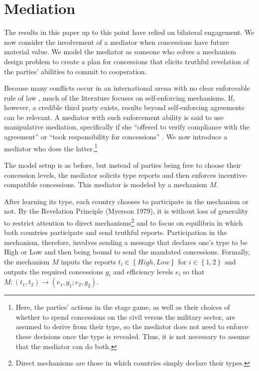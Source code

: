 \documentclass[bibtex,autowc]{apsr_submission}
\begin{document}
\section{Mediation}
\label{sec:med}
The results in this paper up to this point have relied on bilateral engagement. We now consider the involvement of a mediator when concessions have future material value. We model the mediator as someone who solves a mechanism design problem to create a plan for concessions that elicits truthful revelation of the parties' abilities to commit to cooperation. 

Because many conflicts occur in an international arena with no clear enforceable rule of law \citep{waltz2018man}, much of the literature focuses on self-enforcing mechanisms. If, however, a credible third party exists, results beyond self-enforcing agreements can be relevant. A mediator with such enforcement ability is said to use manipulative mediation, specifically if she ``offered to verify compliance with the agreement''  or ``took responsibility for concessions'' \citep{bercovitch1996resolving}. We now introduce a mediator who does the latter.\footnote{Here, the parties' actions in the stage game, as well as their choices of whether to spend concessions on the civil versus the military sector, are assumed to derive from their type, so the mediator does not need to enforce these decisions once the type is revealed. Thus, it is not necessary to assume that the mediator can do both.} 

The model setup is as before, but instead of parties being free to choose their concession levels, the mediator solicits type reports and then enforces incentive-compatible concessions. This mediator is modeled by a mechanism $M$.

After learning its type, each country chooses to participate in the mechanism or not. By the Revelation Principle (Myerson 1979), it is without loss of generality to restrict attention to direct mechanisms\footnote{Direct mechanisms are those in which countries simply declare their types.} and to focus on equilibria in which both countries participate and send truthful reports. Participation in the mechanism, therefore, involves sending a message that declares one's type to be High or Low and then being bound to send the mandated concessions. Formally, the mechanism $M$ inputs the reports $t_i \in \left\{High,Low\right\}$ for $i \in \left\{1,2\right\}$ and outputs the required concessions $g_i$ and efficiency levels $e_i$ so that $ M:(t_1,t_2)\rightarrow( e_1, g_1; e_2,g_2)$.
\end{document}
